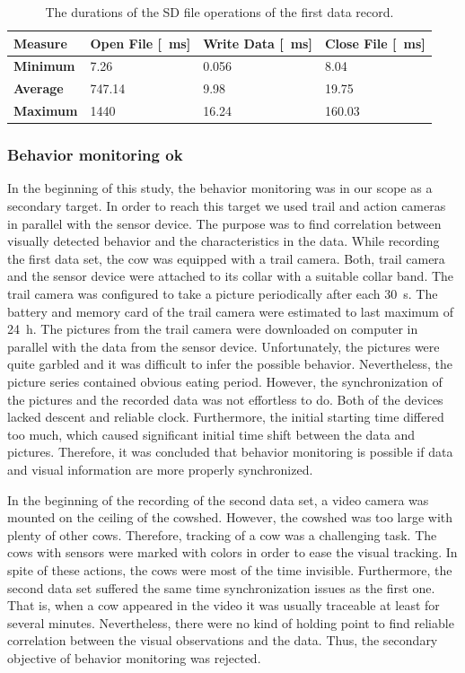\documentclass[english,12pt,a4paper,pdftex,elec,utf8]{aaltothesis}
\begin{document}
\begin{table} \caption{The durations of the SD file operations of the first data record.} \label{fileoperationstable}
\centering
\begin{tabular}{| p{2.75cm} | p{3cm} | p{3cm} | p{3cm} |}
\hline
\textbf{Measure} & \textbf{Open File} [\SI{}{\milli\second}] & \textbf{Write Data} [\SI{}{\milli\second}] & \textbf{Close File} [\SI{}{\milli\second}] \\  \hline
\textbf{Minimum} & 7.26 & 0.056 & 8.04 \\ \hline
\textbf{Average} & 747.14 & 9.98 & 19.75 \\ \hline
\textbf{Maximum} & 1440 & 16.24 & 160.03 \\ \hline
\end{tabular}
\end{table}



\subsubsection{Behavior monitoring ok}

In the beginning of this study, the behavior monitoring was in our scope as a secondary target. In order to reach this target we used trail and action cameras in parallel with the sensor device. The purpose was to find correlation between visually detected behavior and the characteristics in the data. While recording the first data set, the cow was equipped with a trail camera. Both, trail camera and the sensor device were attached to its collar with a suitable collar band. The trail camera was configured to take a picture periodically after each \SI{30}{\second}. The battery and memory card of the trail camera were estimated to last maximum of \SI{24}{\hour}. The pictures from the trail camera were downloaded on computer in parallel with the data from the sensor device. Unfortunately, the pictures were quite garbled and it was difficult to infer the possible behavior. Nevertheless, the picture series contained obvious eating period. However, the synchronization of the pictures and the recorded data was not effortless to do. Both of the devices lacked descent and reliable clock. Furthermore, the initial starting time differed too much, which caused significant initial time shift between the data and pictures. Therefore, it was concluded that behavior monitoring is possible if data and visual information are more properly synchronized.

In the beginning of the recording of the second data set, a video camera was mounted on the ceiling of the cowshed. However, the cowshed was too large with plenty of other cows. Therefore, tracking of a cow was a challenging task. The cows with sensors were marked with colors in order to ease the visual tracking. In spite of these actions, the cows were most of the time invisible. Furthermore, the second data set suffered the same time synchronization issues as the first one. That is, when a cow appeared in the video it was usually traceable at least for several minutes. Nevertheless, there were no kind of holding point to find reliable correlation between the visual observations and the data. Thus, the secondary objective of behavior monitoring was rejected.
\end{document}
